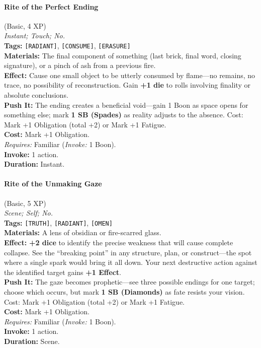 \paragraph{Rite of the Perfect Ending} (Basic, 4 XP) \hfill \\
\emph{Instant; Touch; No.} \\
\textbf{Tags:} \texttt{[RADIANT]}, \texttt{[CONSUME]}, \texttt{[ERASURE]} \\
\textbf{Materials:} The final component of something (last brick, final word, closing signature), or a pinch of ash from a previous fire. \\
\textbf{Effect:} Cause one small object to be utterly consumed by flame---no remains, no trace, no possibility of reconstruction. Gain \textbf{+1 die} to rolls involving finality or absolute conclusions. \\
\textbf{Push It:} The ending creates a beneficial void---gain 1 Boon as space opens for something else; mark \textbf{1 SB (Spades)} as reality adjusts to the absence. Cost: Mark +1 Obligation (total +2) or Mark +1 Fatigue. \\
\textbf{Cost:} Mark +1 Obligation. \\
\textit{Requires:} Familiar (\textit{Invoke:} 1 Boon). \\
\textbf{Invoke:} 1 action. \\
\textbf{Duration:} Instant.

\paragraph{Rite of the Unmaking Gaze} (Basic, 5 XP) \hfill \\
\emph{Scene; Self; No.} \\
\textbf{Tags:} \texttt{[TRUTH]}, \texttt{[RADIANT]}, \texttt{[OMEN]} \\
\textbf{Materials:} A lens of obsidian or fire-scarred glass. \\
\textbf{Effect:} \textbf{+2 dice} to identify the precise weakness that will cause complete collapse. See the ``breaking point'' in any structure, plan, or construct---the spot where a single spark would bring it all down. Your next destructive action against the identified target gains \textbf{+1 Effect}. \\
\textbf{Push It:} The gaze becomes prophetic---see three possible endings for one target; choose which occurs, but mark \textbf{1 SB (Diamonds)} as fate resists your vision. Cost: Mark +1 Obligation (total +2) or Mark +1 Fatigue. \\
\textbf{Cost:} Mark +1 Obligation. \\
\textit{Requires:} Familiar (\textit{Invoke:} 1 Boon). \\
\textbf{Invoke:} 1 action. \\
\textbf{Duration:} Scene.

